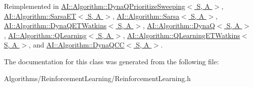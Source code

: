 Reimplemented in \hyperlink{classAI_1_1Algorithm_1_1DynaQPrioritizeSweeping_ad08b55f3cf927189dd31abf9fc1c2959}{A\-I\-::\-Algorithm\-::\-Dyna\-Q\-Prioritize\-Sweeping$<$ S, A $>$}, \hyperlink{classAI_1_1Algorithm_1_1SarsaET_adf13376b7ec8fdfa2b19ffadb1aa81e7}{A\-I\-::\-Algorithm\-::\-Sarsa\-E\-T$<$ S, A $>$}, \hyperlink{classAI_1_1Algorithm_1_1Sarsa_ae1d62478d3e31cace3fb594e05f83d1c}{A\-I\-::\-Algorithm\-::\-Sarsa$<$ S, A $>$}, \hyperlink{classAI_1_1Algorithm_1_1DynaQETWatkins_aa4e40af0fd705cd5d1f7fd13834c57c6}{A\-I\-::\-Algorithm\-::\-Dyna\-Q\-E\-T\-Watkins$<$ S, A $>$}, \hyperlink{classAI_1_1Algorithm_1_1DynaQ_a4542226b17db4ed8a2c5ec17d37dc42f}{A\-I\-::\-Algorithm\-::\-Dyna\-Q$<$ S, A $>$}, \hyperlink{classAI_1_1Algorithm_1_1QLearning_a042e1987ce21a94f59603c4cb1eeed82}{A\-I\-::\-Algorithm\-::\-Q\-Learning$<$ S, A $>$}, \hyperlink{classAI_1_1Algorithm_1_1QLearningETWatkins_a5cbad8c16dfbf6fe72c85fe5c8c4e273}{A\-I\-::\-Algorithm\-::\-Q\-Learning\-E\-T\-Watkins$<$ S, A $>$}, and \hyperlink{classAI_1_1Algorithm_1_1DynaQCC_ae23b8f0afbb9fc5024aef9ce720c9b84}{A\-I\-::\-Algorithm\-::\-Dyna\-Q\-C\-C$<$ S, A $>$}.



The documentation for this class was generated from the following file\-:\begin{DoxyCompactItemize}
\item 
Algorithms/\-Reinforcement\-Learning/Reinforcement\-Learning.\-h\end{DoxyCompactItemize}
